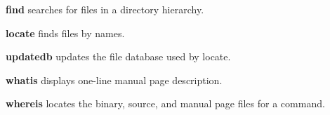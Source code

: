 \begin{compactenum}
\item [\cmdvar] \textbf{find} searches for files in a directory hierarchy.
\item [\cmdvar] \textbf{locate} finds files by names.
\item [\cmdvar] \textbf{updatedb} updates the file database used by locate.
\item [\cmdvar] \textbf{whatis} displays one-line manual page description.
\item [\cmdvar] \textbf{whereis} locates the binary, source, 
and manual page files for a command.
\end{compactenum}
